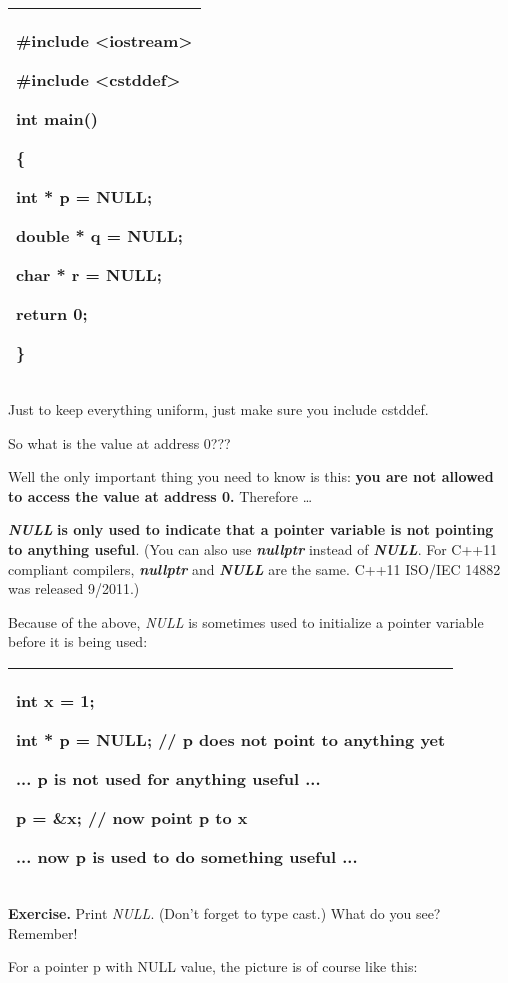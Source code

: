 \documentclass[
]{article}
\begin{document}
\begin{longtable}[]{@{}l@{}}
\toprule
\endhead
\begin{minipage}[t]{0.97\columnwidth}\raggedright
\#include \textless iostream\textgreater{}

\#include \textless cstddef\textgreater{}

int main()

\{

int * p = NULL;

double * q = NULL;

char * r = NULL;

return 0;

\}\strut
\end{minipage}\tabularnewline
\bottomrule
\end{longtable}

Just to keep everything uniform, just make sure you include cstddef.

So what is the value at address 0???

Well the only important thing you need to know is this: \textbf{you are
not allowed to access the value at address 0. }Therefore \ldots{}

\emph{\textbf{NULL}}\textbf{ is only used to indicate that a pointer
variable is not pointing to anything useful}. (You can also use
\emph{\textbf{nullptr}} instead of \emph{\textbf{NULL}}. For C++11
compliant compilers, \emph{\textbf{nullptr}} and \emph{\textbf{NULL}}
are the same. C++11 ISO/IEC 14882 was released 9/2011.)

Because of the above, \emph{NULL} is sometimes used to initialize a
pointer variable before it is being used:

\begin{longtable}[]{@{}l@{}}
\toprule
\endhead
\begin{minipage}[t]{0.97\columnwidth}\raggedright
int x = 1;

int * p = NULL; // p does not point to anything yet

... p is not used for anything useful ...

p = \&x; // now point p to x

... now p is used to do something useful ...\strut
\end{minipage}\tabularnewline
\bottomrule
\end{longtable}

\textbf{Exercise.} Print \emph{NULL}. (Don't forget to type cast.) What
do you see? Remember!

For a pointer p with NULL value, the picture is of course like this:
\end{document}
